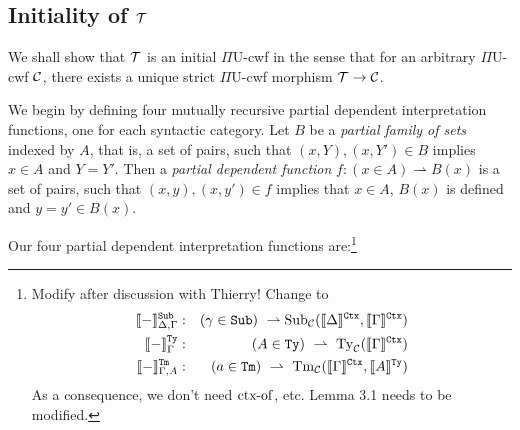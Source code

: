 \documentclass{lmcs}
\def\UU{\mathrm{U}}
\newcommand{\intCtxU}[1]{\llbracket #1 \rrbracket^\RawCtx}
\newcommand{\intSubU}[1]{\llbracket #1 \rrbracket^\RawSub}
\newcommand{\intTyU}[1]{\llbracket #1 \rrbracket^\RawTy}
\newcommand{\intTmU}[1]{\llbracket #1 \rrbracket^\RawTm}
\begin{document}
\subsection{Initiality of ${\mathcal T}$}
\label{sec:freenessT}

We shall show that ${\mathcal T}$ is an initial $\Pi\UU$-cwf in the sense that for an arbitrary $\Pi\UU$-cwf ${\mathcal C}$, there exists a unique strict $\Pi\UU$-cwf morphism ${\mathcal T}  \rightarrow  {\mathcal C}$. 

We begin by defining four mutually recursive partial dependent interpretation functions, one for each syntactic category. Let $B$ be a {\em partial family of sets} indexed by $A$, that is, a set of pairs, such that $(x,Y), (x,Y') \in B$ implies $x \in A$ and $Y=Y'$. Then a {\em partial dependent function} $f :  (x \in A) \rightharpoonup B(x)$  is a set of pairs, such that $(x,y), (x,y') \in f$ implies that $x \in A$, $B(x)$ is defined and $y = y' \in B(x)$.

Our four partial dependent interpretation functions are:\footnote{Modify after discussion with Thierry! Change to
\begin{eqnarray*}
\intSubU{-}_{\Delta,\Gamma} &:&  (\gamma \in \RawSub)\ \rightharpoonup
\Sub_\C(\intCtxU{\Delta}, \intCtxU{\Gamma})\\
\intTyU{-}_\Gamma&:& (A \in \RawTy)\ \rightharpoonup\ \Ty_\C(\intCtxU{\Gamma})\\
\intTmU{-}_{\Gamma,A}&:& (a \in\RawTm)\ \rightharpoonup\
\Tm_\C (\intCtxU{\Gamma}, \intTyU{A})
\end{eqnarray*}
As a consequence, we don't need $\operatorname{ctx-of}$, etc. Lemma 3.1 needs to be modified.
}
\end{document}
